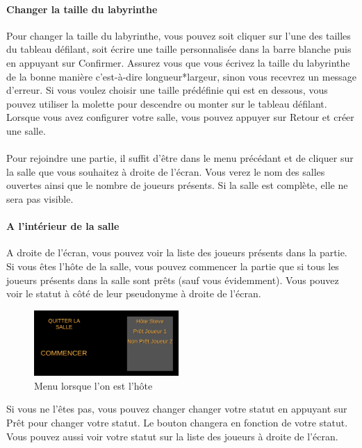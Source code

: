 \documentclass{article}
\begin{document}
\paragraph{Changer la taille du labyrinthe}
Pour changer la taille du labyrinthe, vous pouvez soit cliquer sur l'une des tailles du tableau défilant, soit écrire une taille personnalisée dans la barre blanche puis en appuyant sur Confirmer. Assurez vous que vous écrivez la taille du labyrinthe de la bonne manière c'est-à-dire longueur*largeur, sinon vous recevrez un message d'erreur. Si vous voulez choisir une taille prédéfinie qui est en dessous, vous pouvez utiliser la molette pour descendre ou monter sur le tableau défilant. Lorsque vous avez configurer votre salle, vous pouvez appuyer sur Retour et créer une salle.

\paragraph{}
Pour rejoindre une partie, il suffit d'être dans le menu précédant et de cliquer sur la salle que vous souhaitez à droite de l'écran. Vous verez le nom des salles ouvertes ainsi que le nombre de joueurs présents. Si la salle est complète, elle ne sera pas visible. 

\paragraph{A l'intérieur de la salle}
A droite de l'écran, vous pouvez voir la liste des joueurs présents dans la partie. Si vous êtes l'hôte de la salle, vous pouvez commencer la partie que si tous les joueurs présents dans la salle sont prêts (sauf vous évidemment). Vous pouvez voir le statut à côté de leur pseudonyme à droite de l'écran.

\begin{figure}[H]
	\centering
	\includegraphics[width=0.49\textwidth]{Menu31.png}
	\caption{Menu lorsque l'on est l'hôte}
	\label{Menu lorsque l'on est l'hôte}
\end{figure}

Si vous ne l'êtes pas, vous pouvez changer changer votre statut en appuyant sur Prêt pour changer votre statut. Le bouton changera en fonction de votre statut. Vous pouvez aussi voir votre statut sur la liste des joueurs à droite de l'écran. 
\end{document}
